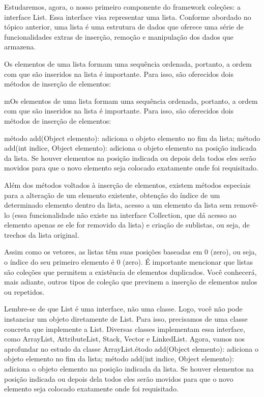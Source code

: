 \documentclass[11pt]{article}
\begin{document}
Estudaremos, agora, o nosso primeiro componente do framework coleções: a interface List. Essa interface visa representar uma lista. Conforme abordado no tópico anterior, uma lista é uma estrutura de dados que oferece uma série de funcionalidades extras de inserção, remoção e manipulação dos dados que armazena.

Os elementos de uma lista formam uma sequência ordenada, portanto, a ordem com que são inseridos na lista é importante. Para isso, são oferecidos dois métodos de inserção de elementos:

mOs elementos de uma lista formam uma sequência ordenada, portanto, a ordem com que são inseridos na lista é importante. Para isso, são oferecidos dois métodos de inserção de elementos:

método add(Object elemento): adiciona o objeto elemento no fim da lista;
método add(int indice, Object elemento): adiciona o objeto elemento na posição indicada da lista. Se houver elementos na posição indicada ou depois dela todos eles serão movidos para que o novo elemento seja colocado exatamente onde foi requisitado.

Além dos métodos voltados à inserção de elementos, existem métodos especiais para a alteração de um elemento existente, obtenção do índice de um determinado elemento dentro da lista, acesso a um elemento da lista sem removê-lo (essa funcionalidade não existe na interface Collection, que dá acesso ao elemento apenas se ele for removido da lista) e criação de sublistas, ou seja, de trechos da lista original.

Assim como os vetores, as listas têm suas posições baseadas em 0 (zero), ou seja, o índice do seu primeiro elemento é 0 (zero). É importante mencionar que listas são coleções que permitem a existência de elementos duplicados. Você conhecerá, mais adiante, outros tipos de coleção que previnem a inserção de elementos nulos ou repetidos.

Lembre-se de que List é uma interface, não uma classe. Logo, você não pode instanciar um objeto diretamente de List. Para isso, precisamos de uma classe concreta que implemente a List. Diversas classes implementam essa interface, como ArrayList, AttributeList, Stack, Vector e LinkedList. Agora, vamos nos aprofundar no estudo da classe ArrayList.étodo add(Object elemento): adiciona o objeto elemento no fim da lista;
método add(int indice, Object elemento): adiciona o objeto elemento na posição indicada da lista. Se houver elementos na posição indicada ou depois dela todos eles serão movidos para que o novo elemento seja colocado exatamente onde foi requisitado.
\end{document}
